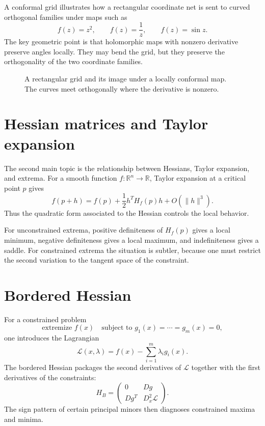 A conformal grid illustrates how a rectangular coordinate net is sent to curved orthogonal families under maps such as
\[
  f(z)=z^2,\qquad f(z)=\frac1z,\qquad f(z)=\sin z.
\]
The key geometric point is that holomorphic maps with nonzero derivative preserve angles locally.  They may bend the grid, but they preserve the orthogonality of the two coordinate families.

\begin{figure}[H]
\centering
{}
\caption{A rectangular grid and its image under a locally conformal map. The curves meet orthogonally where the derivative is nonzero.}
\end{figure}

\section{Hessian matrices and Taylor expansion}

The second main topic is the relationship between Hessians, Taylor expansion, and extrema.  For a smooth function \(f:\mathbb R^n\to\mathbb R\), Taylor expansion at a critical point \(p\) gives
\[
  f(p+h)=f(p)+\frac12 h^T H_f(p)h+O(\|h\|^3).
\]
Thus the quadratic form associated to the Hessian controls the local behavior.

For unconstrained extrema, positive definiteness of \(H_f(p)\) gives a local minimum, negative definiteness gives a local maximum, and indefiniteness gives a saddle.  For constrained extrema the situation is subtler, because one must restrict the second variation to the tangent space of the constraint.

\section{Bordered Hessian}

For a constrained problem
\[
  \text{extremize }f(x)\quad\text{subject to }g_1(x)=\cdots=g_m(x)=0,
\]
one introduces the Lagrangian
\[
  \mathcal L(x,\lambda)=f(x)-\sum_{i=1}^m\lambda_i g_i(x).
\]
The bordered Hessian packages the second derivatives of \(\mathcal L\) together with the first derivatives of the constraints:
\[
  H_B=
  \begin{pmatrix}
  0 & Dg\\
  Dg^T & D_x^2\mathcal L
  \end{pmatrix}.
\]
The sign pattern of certain principal minors then diagnoses constrained maxima and minima.

